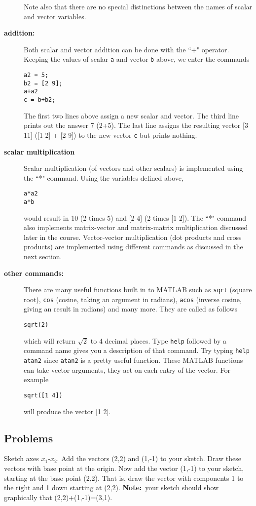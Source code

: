 \begin{description}
Note also that there are no special distinctions between the names of scalar and
vector variables. 
\item[{\bf addition:}] Both scalar and vector addition can be done with 
the ``+" operator. Keeping the values of scalar {\tt a} and vector {\tt b} 
above, we enter the commands
\begin{verbatim}
a2 = 5;
b2 = [2 9];
a+a2
c = b+b2;
\end{verbatim}
The first two lines above assign a new scalar and vector. The third line 
prints out the answer 7 (2+5). The last line assigns the resulting vector 
[3 11] ([1 2] + [2 9]) to the new vector {\tt c} but prints nothing. 
\item[{\bf scalar multiplication}] Scalar multiplication (of vectors and 
other scalars) is implemented using the ``*" command. Using the variables 
defined above,
\begin{verbatim}
a*a2
a*b 
\end{verbatim}
would result in 10 (2 times 5) and [2 4] (2 times [1 2]). The ``*" command 
also implements matrix-vector and matrix-matrix multiplication discussed 
later in the course. Vector-vector multiplication (dot products and 
cross products) are implemented using different commands as discussed in the 
next section. 
\item[{\bf other commands:}] There are many useful functions built 
in to MATLAB such as {\tt sqrt} (square root), {\tt cos} (cosine, taking 
an argument in radians), {\tt acos} (inverse cosine, giving an result 
in radians) and many more. They are called as follows
\begin{verbatim}
sqrt(2)
\end{verbatim}
which will return $\sqrt{2}$ to 4 decimal places. Type {\tt help} followed
by a command name gives you a description of that command. Try 
typing {\tt help atan2} since {\tt atan2} is a pretty useful function. 
These MATLAB functions can take vector arguments, they act on each 
entry of the vector. For example 
\begin{verbatim}
sqrt([1 4])
\end{verbatim}
will produce the vector [1 2]. 
\end{description}

\subsection{Problems} 

\begin{problem}
  \label{2009_a1_1}
Sketch axes $x_1$-$x_2$. Add the vectors (2,2) and (1,-1) to
your sketch. Draw these vectors with base point at the origin. Now add
the vector (1,-1) to your sketch, starting at the base point
(2,2). That is, draw the vector with components 1 to the right and 1
down starting at (2,2). {\bf Note:}\ your sketch should show
graphically that (2,2)+(1,-1)=(3,1).
\end{problem}

